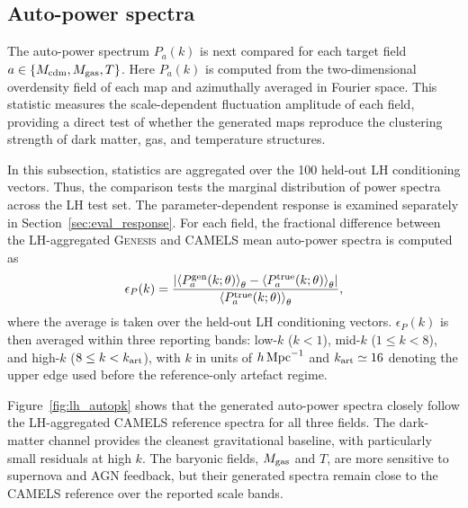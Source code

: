 \documentclass{article}
\newcommand{\Mcdm}{M_{\rm cdm}}
\newcommand{\Mgas}{M_{\rm gas}}
\newcommand{\Tgas}{T}
\begin{document}
\subsection{Auto-power spectra}
\label{sec:eval_autopower}

The auto-power spectrum $P_a(k)$ is next compared for each target field
$a\in\{\Mcdm,\Mgas,\Tgas\}$. Here $P_a(k)$ is computed from the
two-dimensional overdensity field of each map and azimuthally averaged
in Fourier space. This statistic measures the scale-dependent
fluctuation amplitude of each field, providing a direct test of whether
the generated maps reproduce the clustering strength of dark matter,
gas, and temperature structures.

In this subsection, statistics are aggregated over the 100 held-out LH
conditioning vectors. Thus, the comparison tests the marginal distribution of
power spectra across the LH test set. The parameter-dependent response is examined
separately in Section~\ref{sec:eval_response}. For each field, the
fractional difference between the LH-aggregated
\textsc{Genesis} and CAMELS mean auto-power spectra is computed as
\begin{equation}
  \epsilon_P(k)
  =
  \frac{
  \left|
  \left\langle P_a^{\rm gen}(k;\theta)\right\rangle_{\theta}
  -
  \left\langle P_a^{\rm true}(k;\theta)\right\rangle_{\theta}
  \right|
  }{
  \left\langle P_a^{\rm true}(k;\theta)\right\rangle_{\theta}
  },
  \label{eq:lh_auto_eps}
\end{equation}
where the average is taken over the held-out LH conditioning vectors.
$\epsilon_P(k)$ is then averaged within three reporting bands:
low-$k$ ($k<1$), mid-$k$ ($1\leq k<8$), and high-$k$
($8\leq k<k_{\rm art}$), with $k$ in units of
$h\,{\rm Mpc}^{-1}$ and $k_{\rm art}\simeq 16$ denoting the upper
edge used before the reference-only artefact regime.

Figure~\ref{fig:lh_autopk} shows that the generated auto-power spectra
closely follow the LH-aggregated CAMELS reference spectra for all
three fields. The
dark-matter channel provides the cleanest gravitational baseline, with
particularly small residuals at high $k$. The baryonic fields,
$\Mgas$ and $\Tgas$, are more sensitive to supernova and AGN feedback,
but their generated spectra remain close to the CAMELS reference over
the reported scale bands.


\end{document}
